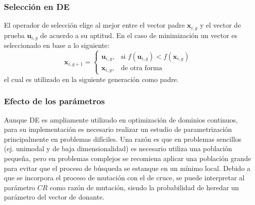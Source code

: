 \subsubsection*{Selección en DE}
El operador de selección elige al mejor entre el vector padre $\boldsymbol{x}_{i,g}$ y el vector de prueba $\boldsymbol{u}_{i,g}$ de acuerdo a su aptitud.
%
En el caso de minimización un vector es seleccionado en base a lo siguiente:
\begin{equation}
   \boldsymbol{x}_{i, g+1} = 
\begin{cases}
      		\boldsymbol{u}_{i,g},& \text{si } f(\boldsymbol{u}_{i,g}) < f(\boldsymbol{x}_{i,g})\\
    		\boldsymbol{x}_{i,g},& \text{de otra forma}
\end{cases}
\end{equation}
el cual es utilizado en la siguiente generación como padre.
%
\subsubsection*{Efecto de los parámetros}

Aunque DE es ampliamente utilizado en optimización de dominios continuos, para su implementación es necesario realizar un estudio de parametrización principalmente en problemas difíciles.
%
Una razón es que en problemas sencillos (ej. unimodal y de baja dimensionalidad) es necesario utiliza una población pequeña, pero en problemas complejos se recomiena aplicar una población grande para evitar que el proceso de búsqueda se estanque en un mínimo local.
%
Debido a que se incorpora el proceso de mutación con el de cruce, se puede interpretar al parámetro $CR$ como razón de mutación, siendo la probabilidad de heredar un parámetro del vector de donante.
%

